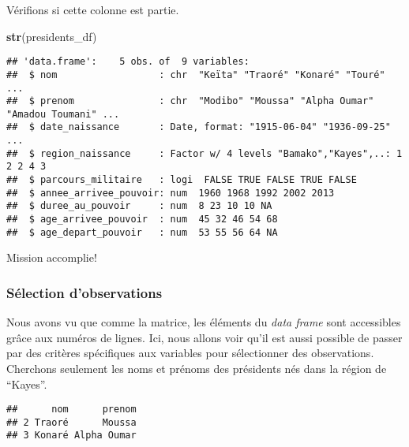 \documentclass[]{book}
\newenvironment{Shaded}{\begin{snugshade}}{\end{snugshade}}
\newcommand{\KeywordTok}[1]{\textcolor[rgb]{0.13,0.29,0.53}{\textbf{#1}}}
\newcommand{\StringTok}[1]{\textcolor[rgb]{0.31,0.60,0.02}{#1}}
\newcommand{\OperatorTok}[1]{\textcolor[rgb]{0.81,0.36,0.00}{\textbf{#1}}}
\newcommand{\NormalTok}[1]{#1}
\begin{document}
Vérifions si cette colonne est partie.

\begin{Shaded}
\begin{Highlighting}[]
\KeywordTok{str}\NormalTok{(presidents_df)}
\end{Highlighting}
\end{Shaded}

\begin{verbatim}
## 'data.frame':    5 obs. of  9 variables:
##  $ nom                  : chr  "Keïta" "Traoré" "Konaré" "Touré" ...
##  $ prenom               : chr  "Modibo" "Moussa" "Alpha Oumar" "Amadou Toumani" ...
##  $ date_naissance       : Date, format: "1915-06-04" "1936-09-25" ...
##  $ region_naissance     : Factor w/ 4 levels "Bamako","Kayes",..: 1 2 2 4 3
##  $ parcours_militaire   : logi  FALSE TRUE FALSE TRUE FALSE
##  $ annee_arrivee_pouvoir: num  1960 1968 1992 2002 2013
##  $ duree_au_pouvoir     : num  8 23 10 10 NA
##  $ age_arrivee_pouvoir  : num  45 32 46 54 68
##  $ age_depart_pouvoir   : num  53 55 56 64 NA
\end{verbatim}

Mission accomplie!

\subsubsection{Sélection d'observations}\label{selection-dobservations}

Nous avons vu que comme la matrice, les éléments du \emph{data frame}
sont accessibles grâce aux numéros de lignes. Ici, nous allons voir
qu'il est aussi possible de passer par des critères spécifiques aux
variables pour sélectionner des observations. Cherchons seulement les
noms et prénoms des présidents nés dans la région de ``Kayes''.

\begin{Shaded}
\end{Shaded}

\begin{verbatim}
##      nom      prenom
## 2 Traoré      Moussa
## 3 Konaré Alpha Oumar
\end{verbatim}
\end{document}
